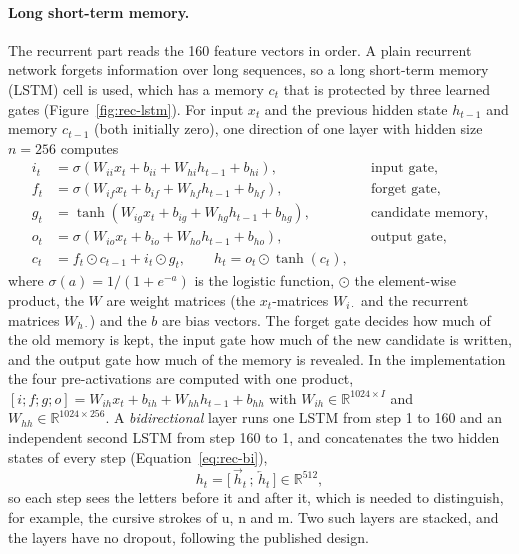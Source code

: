 \paragraph{Long short-term memory.}
The recurrent part reads the 160 feature vectors in order.
A plain recurrent network forgets information over long sequences, so a long short-term memory (LSTM) cell \cite{hochreiter1997} is used, which has a memory $c_t$ that is protected by three learned gates (Figure~\ref{fig:rec-lstm}).
For input $x_t$ and the previous hidden state $h_{t-1}$ and memory $c_{t-1}$ (both initially zero), one direction of one layer with hidden size $n=256$ computes
\begin{equation}
\begin{aligned}
i_t&=\sigma(W_{ii}x_t+b_{ii}+W_{hi}h_{t-1}+b_{hi}), &&\text{input gate,}\\
f_t&=\sigma(W_{if}x_t+b_{if}+W_{hf}h_{t-1}+b_{hf}), &&\text{forget gate,}\\
g_t&=\tanh(W_{ig}x_t+b_{ig}+W_{hg}h_{t-1}+b_{hg}), &&\text{candidate memory,}\\
o_t&=\sigma(W_{io}x_t+b_{io}+W_{ho}h_{t-1}+b_{ho}), &&\text{output gate,}\\
c_t&=f_t\odot c_{t-1}+i_t\odot g_t,\qquad h_t=o_t\odot\tanh(c_t),
\end{aligned}
\label{eq:rec-lstm}
\end{equation}
where $\sigma(a)=1/(1+e^{-a})$ is the logistic function, $\odot$ the element-wise product, the $W$ are weight matrices (the $x_t$-matrices $W_{i\cdot}$ and the recurrent matrices $W_{h\cdot}$) and the $b$ are bias vectors.
The forget gate decides how much of the old memory is kept, the input gate how much of the new candidate is written, and the output gate how much of the memory is revealed.
In the implementation the four pre-activations are computed with one product, $[i;f;g;o]=W_{ih}x_t+b_{ih}+W_{hh}h_{t-1}+b_{hh}$ with $W_{ih}\in\mathbb R^{1024\times I}$ and $W_{hh}\in\mathbb R^{1024\times256}$.
A \emph{bidirectional} layer runs one LSTM from step 1 to 160 and an independent second LSTM from step 160 to 1, and concatenates the two hidden states of every step (Equation~\ref{eq:rec-bi}),
\begin{equation}
h_t=\bigl[\,\overrightarrow{h}_t\,;\,\overleftarrow{h}_t\,\bigr]\in\mathbb R^{512},
\label{eq:rec-bi}
\end{equation}
so each step sees the letters before it and after it, which is needed to distinguish, for example, the cursive strokes of u, n and m.
Two such layers are stacked, and the layers have no dropout, following the published design.


